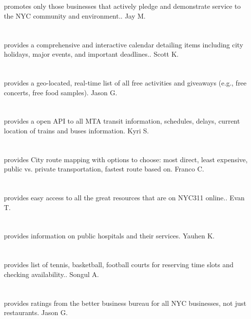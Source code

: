 \section{}promotes only those businesses that actively pledge and demonstrate service to the NYC community and environment.. Jay M.
\section{}provides a comprehensive and interactive calendar detailing items including city holidays,  major events,  and important deadlines.. Scott K.
\section{}provides a geo-located,  real-time list of all free activities and giveaways (e.g.,  free concerts,  free food samples). Jason G.
\section{}provides a open API to all MTA transit information,  schedules,  delays,  current location of trains and buses  information. Kyri S.
\section{}provides City route mapping with options to choose:  most direct,  least expensive,  public vs. private transportation,  fastest route based on. Franco C.
\section{}provides easy access to all the great resources that are on NYC311 online.. Evan T.
\section{}provides information on public hospitals and their services. Yauhen K.
\section{}provides list of tennis,  basketball,  football courts for reserving time slots and checking availability.. Songul A.
\section{}provides ratings from the better business bureau for all NYC businesses,  not just restaurants. Jason G.
